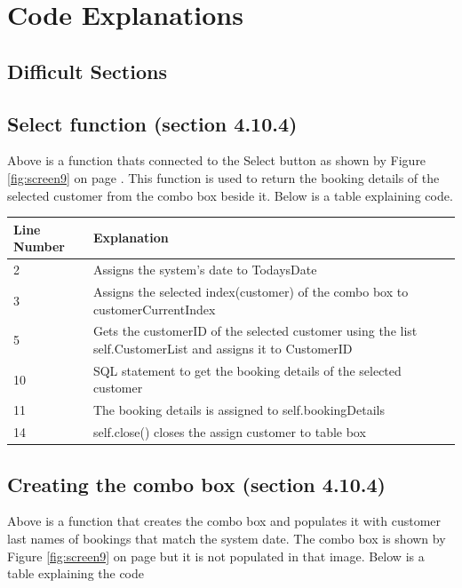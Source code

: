 \section{Code Explanations}

\subsection{Difficult Sections}

\newpage
\subsection{Select function (section 4.10.4)}

Above is a function thats connected to the Select button as shown by Figure \ref{fig:screen9} on page \pageref{fig:screen9}. This function is used to return the booking details of the selected customer from the combo box beside it. Below is a table explaining code.


\begin{center}
\begin{tabular}{|p{5cm}|p{7.5cm}|}
\hline
\textbf{Line Number} & \textbf{Explanation} \\ \hline
2 & Assigns the system's date to TodaysDate \\ \hline
3 & Assigns the selected index(customer) of the combo box to customerCurrentIndex \\ \hline
5 & Gets the customerID of the selected customer using the list self.CustomerList and assigns it to CustomerID \\ \hline
10 & SQL statement to get the booking details of the selected customer  \\ \hline
11 & The booking details is assigned to self.bookingDetails \\ \hline
14 & self.close() closes the assign customer to table box \\ \hline

\end{tabular}
\end{center}
\newpage
\subsection{Creating the combo box (section 4.10.4)}

Above is a function that creates the combo box and populates it with customer last names of bookings that match the system date. The combo box is shown by Figure \ref{fig:screen9} on page \pageref{fig:screen9} but it is not populated in that image. Below is a table explaining the code

